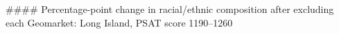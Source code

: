 #### Percentage-point change in racial/ethnic composition after excluding each Geomarket: Long Island, PSAT score 1190–1260
